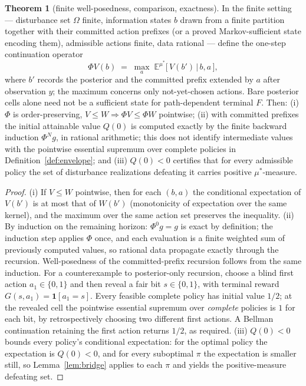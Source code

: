\documentclass[10pt,twocolumn]{article}
\theoremstyle{definition}
\newtheorem{theorem}{Theorem}
\begin{document}
\begin{theorem}[finite well-posedness, comparison, exactness]
\label{thm:envelope-finite}
In the finite setting --- disturbance set $\Omega$ finite, information
states $b$ drawn from a finite partition together with their
committed action prefixes (or a proved Markov-sufficient state encoding
them), admissible actions finite, data rational --- define the
one-step continuation operator
\[
\Phi V(b) \;=\; \max_{a}\; \mathbb{E}^{\mu^{*}}\bigl[\, V(b') \,\big|\, b, a \,\bigr],
\]
where $b'$ records the posterior and the committed prefix
extended by $a$ after observation $y$; the maximum concerns only
not-yet-chosen actions. Bare posterior cells alone need not be a
sufficient state for path-dependent terminal $F$. Then: (i) $\Phi$ is order-preserving,
$V \le W \Rightarrow \Phi V \le \Phi W$ pointwise; (ii)
with committed prefixes the initial attainable value $Q(0)$ is
computed exactly by the finite backward induction \(\Phi^N g\),
in rational arithmetic; this does not identify intermediate values
with the pointwise essential supremum over complete policies in
Definition~\ref{def:envelope}; and (iii) $Q(0) < 0$ certifies that for every admissible policy
the set of disturbance realizations defeating it carries positive
$\mu^{*}$-measure.
\end{theorem}
\begin{proof}
(i) If $V \le W$ pointwise, then for each $(b, a)$ the conditional
expectation of $V(b')$ is at most that of $W(b')$ (monotonicity of
expectation over the same kernel), and the maximum over the same action set
preserves the inequality. (ii) By induction on the remaining horizon:
$\Phi^{0} g = g$ is exact by definition; the induction step applies $\Phi$
once, and each evaluation is a finite weighted sum of previously computed
values, so rational data propagate exactly through the recursion.
Well-posedness of the committed-prefix recursion follows from
the same induction. For a counterexample to posterior-only recursion,
choose a blind first action $a_1\in\{0,1\}$ and then reveal a
fair bit $s\in\{0,1\}$, with terminal reward
$G(s,a_1)=\mathbf{1}[a_1=s]$. Every feasible complete policy has
initial value $1/2$; at the revealed cell the pointwise essential
supremum over \emph{complete} policies is $1$ for each bit, by
retrospectively choosing two different first actions. A Bellman
continuation retaining the first action returns $1/2$, as required. (iii) $Q(0) < 0$ bounds every policy's
conditional expectation: for the optimal policy the expectation is
$Q(0) < 0$, and for every suboptimal $\pi$ the expectation is smaller
still, so Lemma~\ref{lem:bridge} applies to each $\pi$ and yields the
positive-measure defeating set.
\end{proof}
\end{document}
